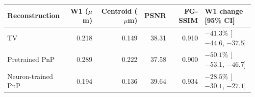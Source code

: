\begin{tabular}{lrrrrl}
\toprule
Reconstruction & W1 ($\mu$m) & Centroid ($\mu$m) & PSNR & FG-SSIM & W1 change [95\% CI] \\
\midrule
TV & 0.218 & 0.149 & 38.31 & 0.910 & $-41.3\%$ [$-44.6$, $-37.5$] \\
Pretrained PnP & 0.289 & 0.222 & 37.58 & 0.900 & $-50.1\%$ [$-53.1$, $-46.7$] \\
Neuron-trained PnP & 0.194 & 0.136 & 39.64 & 0.934 & $-28.5\%$ [$-30.1$, $-27.1$] \\
\bottomrule
\end{tabular}
